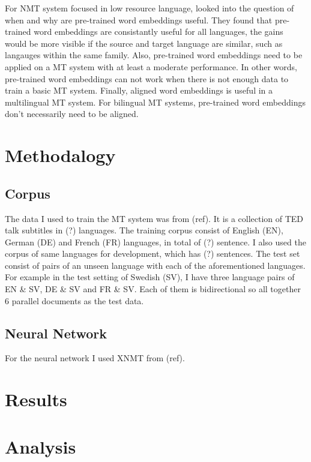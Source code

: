 \documentclass[thesis,fonts=libertine]{cluu}
\begin{document}
For NMT system focused in low resource language, \cite{Qi:2018aa} looked into the question of when and why are pre-trained word embeddings useful. They found that pre-trained word embeddings are consistantly useful for all languages, the gains would be more visible if the source and target language are similar, such as langauges within the same family. Also, pre-trained word embeddings need to be applied on a MT system with at least a moderate performance. In other words, pre-trained word embeddings can not work when there is not enough data to train a basic MT system. Finally, aligned word embeddings is useful in a multilingual MT system. For bilingual MT systems, pre-trained word embeddings don't necessarily need to be aligned.

\chapter{Methodalogy}
\label{chap:method}

\section{Corpus}

The data I used to train the MT system was from (ref). It is a collection of TED talk subtitles in (?) languages. The training corpus consist of English (EN), German (DE) and French (FR) languages, in total of (?) sentence. I also used the corpus of same languages for development, which has (?) sentences. The test set consist of pairs of an unseen language with each of the aforementioned	languages. For example in the test setting of Swedish (SV), I have three language pairs of EN \& SV, DE \& SV and FR \& SV. Each of them is bidirectional so all together 6 parallel documents as the test data.

\section{Neural Network}

For the neural network I used XNMT from (ref). 

\chapter{Results}
\label{chap:results}

\chapter{Analysis}
\label{chap:analysis}

\printbibliography
\end{document}
